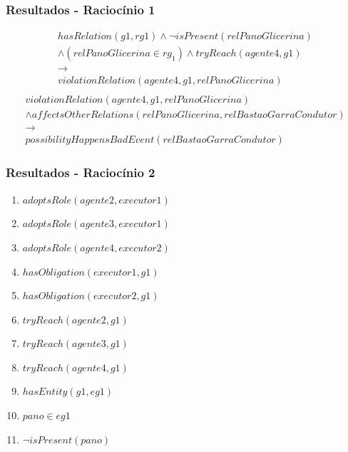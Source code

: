 \documentclass{beamer}
\begin{document}
\begin{frame}
	\frametitle{Resultados - Raciocínio 1}
	\begin{eqnarray}\nonumber
		hasRelation(g1,rg1)\wedge \neg isPresent(relPanoGlicerina)  \nonumber \\ 
		\wedge (relPanoGlicerina\in rg_1) \wedge tryReach(agente4,g1) \nonumber \\ 
		\to \nonumber \\ 
		violationRelation(agente4,g1,relPanoGlicerina) \nonumber \\	
	\end{eqnarray}
	\begin{eqnarray}\nonumber
		violationRelation(agente4,g1,relPanoGlicerina)  \nonumber \\ 
		\wedge affectsOtherRelations(relPanoGlicerina,relBastaoGarraCondutor)   \nonumber \\ 
		\to \nonumber \\  
		possibilityHappensBadEvent(relBastaoGarraCondutor) 
	\end{eqnarray}
\end{frame}
\begin{frame}
	\frametitle{Resultados - Raciocínio 2}
	\begin{enumerate}
		\item $adoptsRole(agente2,executor1)$ 
		\item $adoptsRole(agente3,executor1)$	 	
		\item $adoptsRole(agente4,executor2)$	 
		\item $hasObligation(executor1,g1)$
		\item $hasObligation(executor2,g1)$
		\item $tryReach(agente2,g1)$ 
		\item $tryReach(agente3,g1)$	 	
		\item $tryReach(agente4,g1)$	
		\item $hasEntity(g1,eg1)$		
		\item $pano \in eg1$
		\item $\neg isPresent(pano)$
	\end{enumerate}
\end{frame}
\end{document}
